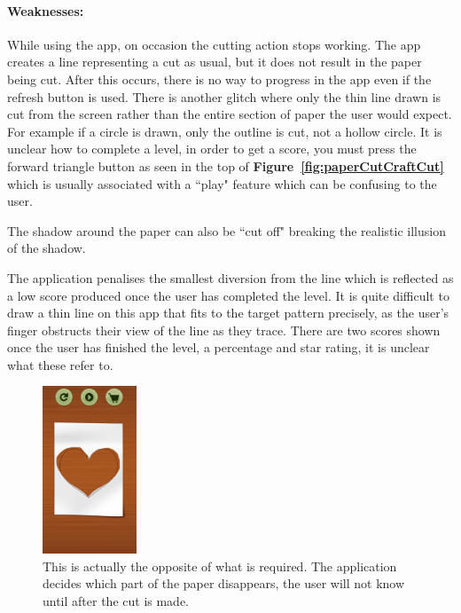 \documentclass[11pt]{article}
\begin{document}
                \paragraph{Weaknesses:}
                While using the app, on occasion the cutting action stops working. The app creates a line representing a cut as usual, but it does not result in the paper being cut. After this occurs, there is no way to progress in the app even if the refresh button is used. There is another glitch where only the thin line drawn is cut from the screen rather than the entire section of paper the user would expect. For example if a circle is drawn, only the outline is cut, not a hollow circle. 
                It is unclear how to complete a level, in order to get a score, you must press the forward triangle button as seen in the top of \textbf{Figure~\ref{fig:paperCutCraftCut}} which is usually associated with a ``play" feature which can be confusing to the user. 
                
                The shadow around the paper can also be ``cut off" breaking the realistic illusion of the shadow.
                
                The application penalises the smallest diversion from the line which is reflected as a low score produced once the user has completed the level. It is quite difficult to draw a thin line on this app that fits to the target pattern precisely, as the user's finger obstructs their view of the line as they trace. There are two scores shown once the user has finished the level, a percentage and star rating, it is unclear what these refer to. 
                
                 \begin{figure}
                \includegraphics[width=0.25\textwidth]{Images/paperCutCraftReveal}
                    \caption{This is actually the opposite of what is required. The application decides which part of the paper disappears, the user will not know until after the cut is made.}
                    \label{fig:paperCutCraftReveal}
                \end{figure}
                
\end{document}
